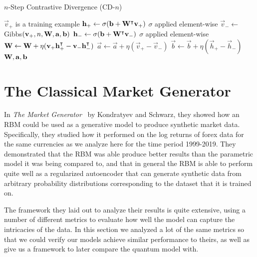 \begin{algorithm}
    \caption{$n$-Step Contrastive Divergence (CD-$n$)}
\begin{algorithmic}[1]
        \Comment $\vec{v}_+$ is a training example
        \State $\mathbf{h}_+ \gets \sigma(\mathbf{b} + \mathbf{W}^\intercal\mathbf{v}_+)$
            \Comment $\sigma$ applied element-wise
        \State $\vec{v}_- \gets$ Gibbs$(\mathbf{v}_+,n,\mathbf{W},\mathbf{a},\mathbf{b})$
        \State $\mathbf{h}_- \gets \sigma(\mathbf{b} + \mathbf{W}^\intercal\mathbf{v}_-)$
            \Comment $\sigma$ applied element-wise
        \State $\mathbf{W} \gets \mathbf{W} + \eta(\mathbf{v}_+ \mathbf{h}_+^\intercal - \mathbf{v}_- \mathbf{h}_-^\intercal)$
        \State $\vec{a} \gets \vec{a} + \eta(\vec{v}_+ - \vec{v}_-)$
        \State $\vec{b} \gets \vec{b} + \eta(\vec{h}_+ - \vec{h}_-)$
        \State \Return $\mathbf{W}, \mathbf{a}, \mathbf{b}$
    \EndProcedure
\end{algorithmic}
\label{alg:CDn}
\end{algorithm}


\section{The Classical Market Generator}
In \textit{The Market Generator}~\cite{kondratyev_2019} by Kondratyev and Schwarz, they showed how an RBM could be used as a generative model to produce synthetic market data.
Specifically, they studied how it performed on the log returns of forex data for the same currencies as we analyze here for the time period 1999-2019.
They demonstrated that the RBM was able produce better results than the parametric model it was being compared to, and that in general the RBM is able to perform quite well as a regularized autoencoder that can generate synthetic data from arbitrary probability distributions corresponding to the dataset that it is trained on.

The framework they laid out to analyze their results is quite extensive, using a number of different metrics to evaluate how well the model can capture the intricacies of the data.
In this section we analyzed a lot of the same metrics so that we could verify our models achieve similar performance to theirs, as well as give us a framework to later compare the quantum model with.

